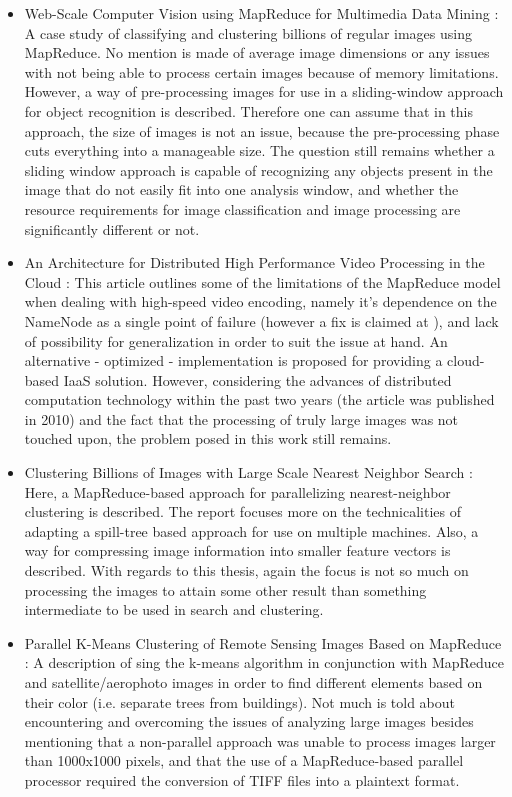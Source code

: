 \documentclass [12pt,a4paper]{report}
\begin{document}
\begin{itemize}
	\item Web-Scale Computer Vision using MapReduce for Multimedia Data Mining \cite{White:2010:WCV:1814245.1814254}: A case study of classifying and clustering billions of regular images using MapReduce. No mention is made of average image dimensions or any issues with not being able to process certain images because of memory limitations. However, a way of pre-processing images for use in a sliding-window approach for object recognition is described. Therefore one can assume that in this approach, the size of images is not an issue, because the pre-processing phase cuts everything into a manageable size. The question still remains whether a sliding window approach is capable of recognizing any objects present in the image that do not easily fit into one analysis window, and whether the resource requirements for image classification and image processing are significantly different or not.
	\item An Architecture for Distributed High Performance Video Processing in the Cloud \cite{Pereira:2010:ADH:1844768.1845374}: This article outlines some of the limitations of the MapReduce model when dealing with high-speed video encoding, namely it's dependence on the NameNode as a single point of failure (however a fix is claimed at \cite{website:facebook_namenode_improvements}), and lack of possibility for generalization in order to suit the issue at hand. An alternative - optimized - implementation is proposed for providing a cloud-based IaaS solution. However, considering the advances of distributed computation technology within the past two years (the article was published in 2010) and the fact that the processing of truly large images was not touched upon, the problem posed in this work still remains.
	\item Clustering Billions of Images with Large Scale Nearest Neighbor Search \cite{citeulike:2631015}: Here, a MapReduce-based approach for parallelizing nearest-neighbor clustering is described. The report focuses more on the technicalities of adapting a spill-tree based approach for use on multiple machines. Also, a way for compressing image information into smaller feature vectors is described. With regards to this thesis, again the focus is not so much on processing the images to attain some other result than something intermediate to be used in search and clustering.
	\item Parallel K-Means Clustering of Remote Sensing Images Based on MapReduce \cite{Lv:2010:PKC:1927661.1927687}: A description of sing the k-means algorithm in conjunction with MapReduce and satellite/aerophoto images in order to find different elements based on their color (i.e. separate trees from buildings). Not much is told about encountering and overcoming the issues of analyzing large images besides mentioning that a non-parallel approach was unable to process images larger than 1000x1000 pixels, and that the use of a MapReduce-based parallel processor required the conversion of TIFF files into a plaintext format. 

\end{itemize}
\end{document}
